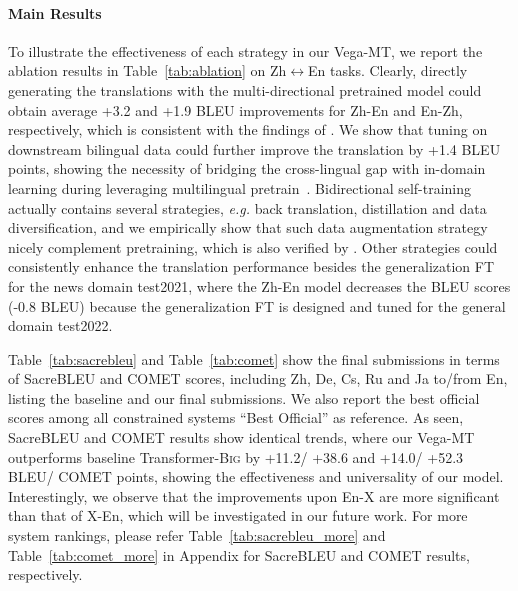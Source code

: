 \documentclass[11pt,a4paper]{article}
\begin{document}
\paragraph{Main Results}
To illustrate the effectiveness of each strategy in our Vega-MT, we report the ablation results in Table~\ref{tab:ablation} on Zh$\leftrightarrow$En tasks. Clearly, directly generating the translations with the multi-directional pretrained model could obtain average +3.2 and +1.9 BLEU improvements for Zh-En and En-Zh, respectively, which is consistent with the findings of \citet{facebook2021}. We show that tuning on downstream bilingual data could further improve the translation by +1.4 BLEU points, showing the necessity of bridging the cross-lingual gap with in-domain learning during leveraging multilingual pretrain~\cite{Zan2022BridgingCG}. 
Bidirectional self-training actually contains several strategies, \textit{e.g.} back translation, distillation and data diversification, and we empirically show that such data augmentation strategy nicely complement pretraining, which is also verified by \citet{Liu2021OnTC}.
Other strategies could consistently enhance the translation performance besides the generalization FT for the news domain test2021, where the Zh-En model decreases the BLEU scores (-0.8 BLEU) because the generalization FT is designed and tuned for the general domain test2022.

Table~\ref{tab:sacrebleu} and Table~\ref{tab:comet} show the final submissions in terms of SacreBLEU and COMET scores, including Zh, De, Cs, Ru and Ja to/from En, listing the baseline and our final submissions.
We also report the best official scores among all constrained systems ``Best Official'' as reference.
As seen, SacreBLEU and COMET results show identical trends, where our Vega-MT outperforms baseline Transformer-\textsc{Big} by +11.2/ +38.6 and +14.0/ +52.3 BLEU/ COMET points, showing the effectiveness and universality of our model. Interestingly, we observe that the improvements upon En-X are more significant than that of X-En, which will be investigated in our future work.
For more system rankings, please refer Table~\ref{tab:sacrebleu_more} and Table~\ref{tab:comet_more} in Appendix for SacreBLEU and COMET results, respectively.
\end{document}
